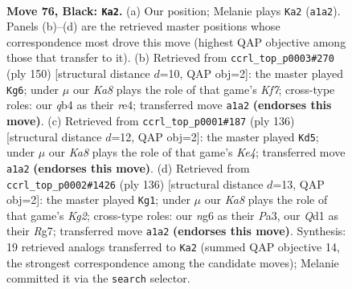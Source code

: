 \documentclass[11pt]{article}
\begin{document}
\clearpage

\begin{figure}[p]\centering
\begin{subfigure}{0.46\textwidth}\centering
\resizebox{\linewidth}{!}{%
\newchessgame
\chessboard[
  setfen={8/7K/6N1/8/1Q6/8/8/k2q4 b - - 22 76},
  showmover=false,
  pgfstyle=straightmove, color=movearrow, markmove={a1-a2}
]}
\caption{}
\end{subfigure}\hfill
\begin{subfigure}{0.46\textwidth}\centering
\resizebox{\linewidth}{!}{%
\newchessgame
\chessboard[
  setfen={8/5K2/3k4/8/4r3/1Q6/8/8 w - - 9 76},
  showmover=false,
  pgfstyle=straightmove, color=movearrow, markmove={f7-g6}
]}
\caption{}
\end{subfigure}
\\[4pt]
\begin{subfigure}{0.46\textwidth}\centering
\resizebox{\linewidth}{!}{%
\newchessgame
\chessboard[
  setfen={8/8/k7/8/1Q2K3/8/8/8 w - - 7 69},
  showmover=false,
  pgfstyle=straightmove, color=movearrow, markmove={e4-d5}
]}
\caption{}
\end{subfigure}\hfill
\begin{subfigure}{0.46\textwidth}\centering
\resizebox{\linewidth}{!}{%
\newchessgame
\chessboard[
  setfen={5r2/6R1/8/2nk4/8/P7/6K1/8 w - - 2 69},
  showmover=false,
  pgfstyle=straightmove, color=movearrow, markmove={g2-g1}
]}
\caption{}
\end{subfigure}
\caption{\textbf{Move 76, Black: \texttt{Ka2}.} (a) Our position; Melanie plays \texttt{Ka2} (\texttt{a1a2}). Panels (b)--(d) are the retrieved master positions whose correspondence most drove this move (highest QAP objective among those that transfer to it). (b) Retrieved from \texttt{ccrl\_top\_p0003\#270} (ply 150) [structural distance $d$=10, QAP obj=2]: the master played \texttt{Kg6}; under $\mu$ our \emph{Ka8} plays the role of that game's \emph{Kf7}; cross-type roles: our \emph{q}b4 as their \emph{r}e4; transferred move \texttt{a1a2} \textbf{(endorses this move)}. (c) Retrieved from \texttt{ccrl\_top\_p0001\#187} (ply 136) [structural distance $d$=12, QAP obj=2]: the master played \texttt{Kd5}; under $\mu$ our \emph{Ka8} plays the role of that game's \emph{Ke4}; transferred move \texttt{a1a2} \textbf{(endorses this move)}. (d) Retrieved from \texttt{ccrl\_top\_p0002\#1426} (ply 136) [structural distance $d$=13, QAP obj=2]: the master played \texttt{Kg1}; under $\mu$ our \emph{Ka8} plays the role of that game's \emph{Kg2}; cross-type roles: our \emph{n}g6 as their \emph{P}a3, our \emph{Q}d1 as their \emph{R}g7; transferred move \texttt{a1a2} \textbf{(endorses this move)}. Synthesis: 19 retrieved analogs transferred to \texttt{Ka2} (summed QAP objective 14, the strongest correspondence among the candidate moves); Melanie committed it via the \texttt{search} selector.}
\label{fig:thought-m151}
\end{figure}
\end{document}
